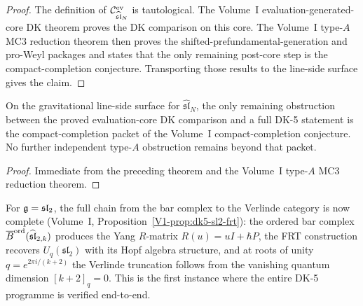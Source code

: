 \begin{proof}
The definition of $\mathcal{C}^{\mathrm{ev}}_{\widehat{\mathfrak{sl}}_N}$ is
tautological. The Volume~I evaluation-generated-core DK theorem proves
the DK comparison on this core. The Volume~I type-$A$ MC3 reduction theorem
then proves the shifted-prefundamental-generation and pro-Weyl
packages and states that the only remaining post-core step is
the compact-completion conjecture. Transporting those
results to the line-side surface gives the claim.
\end{proof}

\begin{corollary}
On the gravitational line-side surface for
$\widehat{\mathfrak{sl}}_N$, the only remaining obstruction between the
proved evaluation-core DK comparison and a full DK-5 statement is the
compact-completion packet of
the Volume~I compact-completion conjecture. No further independent
type-$A$ obstruction remains beyond that packet.
\end{corollary}

\begin{proof}
Immediate from the preceding theorem and the Volume~I type-$A$ MC3
reduction theorem.
\end{proof}

\begin{remark}
\label{rem:vol2-dk5-sl2}
For $\mathfrak{g} = \mathfrak{sl}_2$, the full chain from the bar complex to the
Verlinde category is now complete
\textup{(}Volume~I,
Proposition~\textup{\ref*{V1-prop:dk5-sl2-frt})}: the ordered bar
complex $\overline{B}^{\mathrm{ord}}(\widehat{\mathfrak{sl}}_{2,k})$ produces
the Yang $R$-matrix $R(u) = uI + \hbar P$, the FRT construction
recovers $U_q(\mathfrak{sl}_2)$ with its Hopf algebra structure, and
at roots of unity $q = e^{2\pi i/(k+2)}$ the Verlinde truncation follows
from the vanishing quantum dimension $[k{+}2]_q = 0$. This is the first
instance where the entire DK-5 programme is verified end-to-end.
\end{remark}

